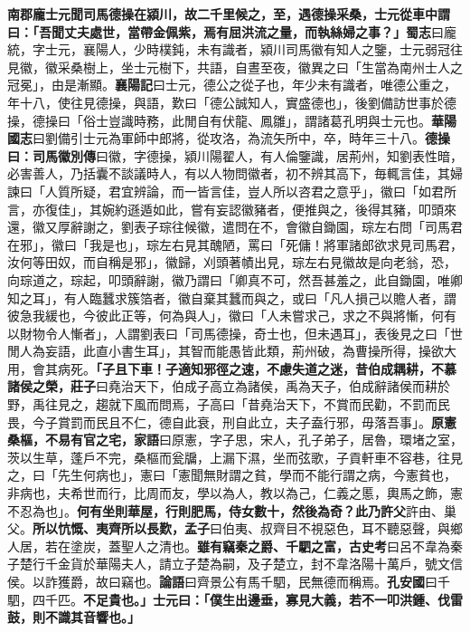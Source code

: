 \textbf{南郡龐士元聞司馬德操在潁川，故二千里候之，至，遇德操采桑，士元從車中謂曰：「吾聞丈夫處世，當帶金佩紫，焉有屈洪流之量，而執絲婦之事？」}{\footnotesize \textbf{蜀志}曰龐統，字士元，襄陽人，少時樸鈍，未有識者，潁川司馬徽有知人之鑒，士元弱冠往見徽，徽采桑樹上，坐士元樹下，共語，自晝至夜，徽異之曰「生當為南州士人之冠冕」，由是漸顯。\textbf{襄陽記}曰士元，德公之從子也，年少未有識者，唯德公重之，年十八，使往見德操，與語，歎曰「德公誠知人，實盛德也」，後劉備訪世事於德操，德操曰「俗士豈識時務，此閒自有伏龍、鳳雛」，謂諸葛孔明與士元也。\textbf{華陽國志}曰劉備引士元為軍師中郎將，從攻洛，為流矢所中，卒，時年三十八。}\textbf{德操曰：}{\footnotesize \textbf{司馬徽別傳}曰徽，字德操，潁川陽翟人，有人倫鑒識，居荊州，知劉表性暗，必害善人，乃括囊不談議時人，有以人物問徽者，初不辨其高下，毎輒言佳，其婦諫曰「人質所疑，君宜辨論，而一皆言佳，豈人所以咨君之意乎」，徽曰「如君所言，亦復佳」，其婉約遜遁如此，嘗有妄認徽豬者，便推與之，後得其豬，叩頭來還，徽又厚辭謝之，劉表子琮往候徽，遣問在不，會徽自鋤園，琮左右問「司馬君在邪」，徽曰「我是也」，琮左右見其醜陋，罵曰「死傭！將軍諸郎欲求見司馬君，汝何等田奴，而自稱是邪」，徽歸，刈頭著幘出見，琮左右見徽故是向老翁，恐，向琮道之，琮起，叩頭辭謝，徽乃謂曰「卿真不可，然吾甚羞之，此自鋤園，唯卿知之耳」，有人臨蠶求簇箔者，徽自棄其蠶而與之，或曰「凡人損己以贍人者，謂彼急我緩也，今彼此正等，何為與人」，徽曰「人未嘗求己，求之不與將慚，何有以財物令人慚者」，人謂劉表曰「司馬德操，奇士也，但未遇耳」，表後見之曰「世閒人為妄語，此直小書生耳」，其智而能愚皆此類，荊州破，為曹操所得，操欲大用，會其病死。}\textbf{「子且下車！子適知邪徑之速，不慮失道之迷，昔伯成耦耕，不慕諸侯之榮，}{\footnotesize \textbf{莊子}曰堯治天下，伯成子高立為諸侯，禹為天子，伯成辭諸侯而耕於野，禹往見之，趨就下風而問焉，子高曰「昔堯治天下，不賞而民勸，不罰而民畏，今子賞罰而民且不仁，德自此衰，刑自此立，夫子盍行邪，毋落吾事」。}\textbf{原憲桑樞，不易有官之宅，}{\footnotesize \textbf{家語}曰原憲，字子思，宋人，孔子弟子，居魯，環堵之室，茨以生草，蓬戶不完，桑樞而瓮牖，上漏下濕，坐而弦歌，子貢軒車不容巷，往見之，曰「先生何病也」，憲曰「憲聞無財謂之貧，學而不能行謂之病，今憲貧也，非病也，夫希世而行，比周而友，學以為人，教以為己，仁義之慝，輿馬之飾，憲不忍為也」。}\textbf{何有坐則華屋，行則肥馬，侍女數十，然後為奇？此乃許父}{\footnotesize 許由、巢父。}\textbf{所以忼慨、夷齊所以長歎，}{\footnotesize \textbf{孟子}曰伯夷、叔齊目不視惡色，耳不聽惡聲，與鄉人居，若在塗炭，蓋聖人之清也。}\textbf{雖有竊秦之爵、千駟之富，}{\footnotesize \textbf{古史考}曰呂不韋為秦子楚行千金貨於華陽夫人，請立子楚為嗣，及子楚立，封不韋洛陽十萬戶，號文信侯。以詐獲爵，故曰竊也。\textbf{論語}曰齊景公有馬千駟，民無德而稱焉。\textbf{孔安國}曰千駟，四千匹。}\textbf{不足貴也。」士元曰：「僕生出邊垂，寡見大義，若不一叩洪鍾、伐雷鼓，則不識其音響也。」}


